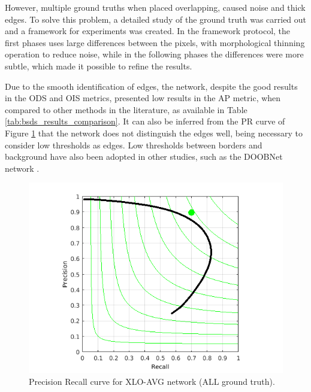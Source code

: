 However, multiple ground truths when placed overlapping, caused noise and thick edges.
To solve this problem, a detailed study of the ground truth was carried out and a framework for experiments was created.
In the framework protocol, the first phases uses large differences between the pixels, with morphological thinning operation to reduce noise, while in the following phases the differences were more subtle, which made it possible to refine the results.


Due to the smooth identification of edges, the network, despite the good results in the ODS and OIS metrics, presented low results in the AP metric, when compared to other methods in the literature, as available in Table \ref{tab:bsds_results_comparison}.
It can also be inferred from the PR curve of Figure \ref{fig:bsds_xlo_avg_curve} that the network does not distinguish the edges well, being necessary to consider low thresholds as edges. 
Low thresholds between borders and background have also been adopted in other studies, such as the DOOBNet network \cite{Cumulative:Song20181847}.

\begin{figure}%
  \centering
  \includegraphics[width=0.9\columnwidth]{../imagens/graficos/cap6_xlo-avg.png}
  \caption{\color{red}Precision Recall curve for XLO-AVG network (ALL ground truth).}
  \label{fig:bsds_xlo_avg_curve}
\end{figure}

